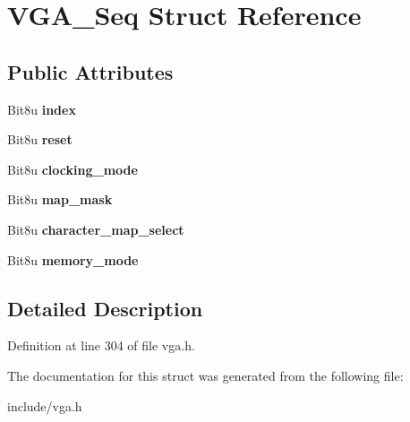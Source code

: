 \hypertarget{structVGA__Seq}{\section{V\-G\-A\-\_\-\-Seq Struct Reference}
\label{structVGA__Seq}
}
\subsection*{Public Attributes}
\begin{DoxyCompactItemize}
\item 
\hypertarget{structVGA__Seq_a00643c92e5873dcf83d17a3135b2d693}{Bit8u {\bfseries index}}\label{structVGA__Seq_a00643c92e5873dcf83d17a3135b2d693}

\item 
\hypertarget{structVGA__Seq_a3425fe4beaea31df04abd4a6b4dc34ce}{Bit8u {\bfseries reset}}\label{structVGA__Seq_a3425fe4beaea31df04abd4a6b4dc34ce}

\item 
\hypertarget{structVGA__Seq_a86024bda4c152b6e0bee83581155233e}{Bit8u {\bfseries clocking\-\_\-mode}}\label{structVGA__Seq_a86024bda4c152b6e0bee83581155233e}

\item 
\hypertarget{structVGA__Seq_a318a641c4a0ca18dd7de0de41e475bdc}{Bit8u {\bfseries map\-\_\-mask}}\label{structVGA__Seq_a318a641c4a0ca18dd7de0de41e475bdc}

\item 
\hypertarget{structVGA__Seq_a259ad5c028390b8e3f2247913c493044}{Bit8u {\bfseries character\-\_\-map\-\_\-select}}\label{structVGA__Seq_a259ad5c028390b8e3f2247913c493044}

\item 
\hypertarget{structVGA__Seq_a73f957b3431c728ff5908dfb58ed1e75}{Bit8u {\bfseries memory\-\_\-mode}}\label{structVGA__Seq_a73f957b3431c728ff5908dfb58ed1e75}

\end{DoxyCompactItemize}


\subsection{Detailed Description}


Definition at line 304 of file vga.\-h.



The documentation for this struct was generated from the following file\-:\begin{DoxyCompactItemize}
\item 
include/vga.\-h\end{DoxyCompactItemize}
